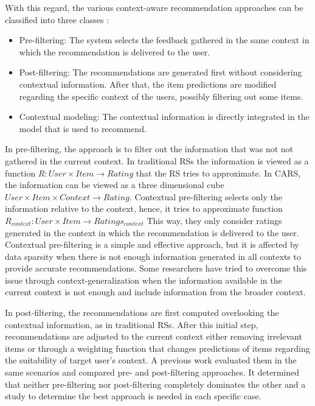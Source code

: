\documentclass[preprint]{elsarticle}
\begin{document}
\begin{spacing}{1.5}
With this regard, the various context-aware recommendation approaches can be classified into three classes \cite{Adomavicius2011}:
\begin{itemize}
	\item Pre-filtering: The system selects the feedback gathered in the same context in which the recommendation is delivered to the user.
	\item Post-filtering: The recommendations are generated first without considering contextual information. After that, the item predictions are modified regarding the specific context of the users, possibly filtering out some items.
	\item Contextual modeling: The contextual information is directly integrated in the model that is used to recommend.
\end{itemize}

In pre-filtering, the approach is to filter out the information that was not not gathered in the current context. In traditional RSs the information is viewed as a function $R: User \times Item \rightarrow Rating $ that the RS tries to approximate. In CARS, the information can be viewed as a three dimensional cube $User \times Item \times Context \rightarrow Rating$. Contextual pre-filtering selects only the information relative to the context, hence, it tries to approximate function $R_{context}: User \times Item \rightarrow Ratings_{context}$ This way, they only consider ratings generated in the context in which the recommendation is delivered to the user. Contextual pre-filtering is a simple and effective approach, but it is affected by data sparsity when there is not enough information generated in all contexts to provide accurate recommendations. Some researchers have tried to overcome this issue through context-generalization \cite{Adomavicius2011} when the information available in the current context is not enough and include information from the broader context.

In post-filtering, the recommendations are first computed overlooking the contextual information, as in traditional RSs. After this initial step, recommendations are adjusted to the current context either removing irrelevant items or through a weighting function that changes predictions of items regarding the suitability of target user's context. A previous work \cite{Panniello2009} evaluated them in the same scenarios and compared pre- and post-filtering approaches. It determined that neither pre-filtering nor post-filtering completely dominates the other and a study to determine the best approach is needed in each specific case.


\end{spacing}
\end{document}
